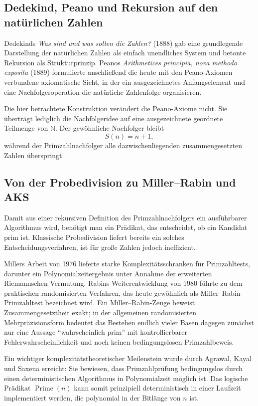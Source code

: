 \documentclass[11pt]{article}
\theoremstyle{definition}
\newcommand{\N}{\mathbb{N}}
\newcommand{\Prime}{\operatorname{Prime}}
\begin{document}
\subsection{Dedekind, Peano und Rekursion auf den natürlichen Zahlen}

Dedekinds \emph{Was sind und was sollen die Zahlen?} (1888) gab eine grundlegende Darstellung der natürlichen Zahlen als einfach unendliches System und betonte Rekursion als Strukturprinzip. Peanos \emph{Arithmetices principia, nova methodo exposita} (1889) formulierte anschließend die heute mit den Peano-Axiomen verbundene axiomatische Sicht, in der ein ausgezeichnetes Anfangselement und eine Nachfolgeroperation die natürliche Zahlenfolge organisieren.

Die hier betrachtete Konstruktion verändert die Peano-Axiome nicht. Sie überträgt lediglich die Nachfolgeridee auf eine ausgezeichnete geordnete Teilmenge von $\N$. Der gewöhnliche Nachfolger bleibt
\[
S(n)=n+1,
\]
während der Primzahlnachfolger alle dazwischenliegenden zusammengesetzten Zahlen überspringt.

\subsection{Von der Probedivision zu Miller--Rabin und AKS}

Damit aus einer rekursiven Definition des Primzahlnachfolgers ein ausführbarer Algorithmus wird, benötigt man ein Prädikat, das entscheidet, ob ein Kandidat prim ist. Klassische Probedivision liefert bereits ein solches Entscheidungsverfahren, ist für große Zahlen jedoch ineffizient.

Millers Arbeit von 1976 lieferte starke Komplexitätsschranken für Primzahltests, darunter ein Polynomialzeitergebnis unter Annahme der erweiterten Riemannschen Vermutung. Rabins Weiterentwicklung von 1980 führte zu dem praktischen randomisierten Verfahren, das heute gewöhnlich als Miller--Rabin-Primzahltest bezeichnet wird. Ein Miller--Rabin-Zeuge beweist Zusammengesetztheit exakt; in der allgemeinen randomisierten Mehrpräzisionsform bedeutet das Bestehen endlich vieler Basen dagegen zunächst nur eine Aussage ``wahrscheinlich prim'' mit kontrollierbarer Fehlerwahrscheinlichkeit und noch keinen bedingungslosen Primzahlbeweis.

Ein wichtiger komplexitätstheoretischer Meilenstein wurde durch Agrawal, Kayal und Saxena erreicht: Sie bewiesen, dass Primzahlprüfung bedingungslos durch einen deterministischen Algorithmus in Polynomialzeit möglich ist. Das logische Prädikat $\Prime(n)$ kann somit prinzipiell deterministisch in einer Laufzeit implementiert werden, die polynomial in der Bitlänge von $n$ ist.
\end{document}
